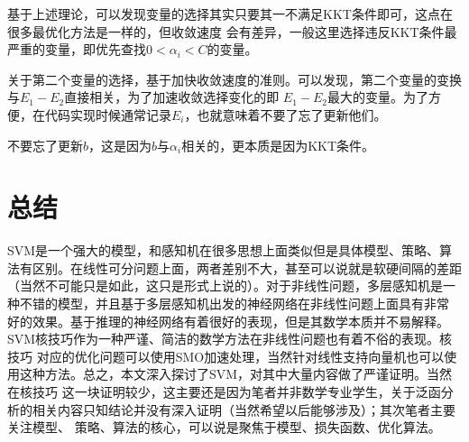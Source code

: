 \documentclass{article}
\begin{document}
        基于上述理论，可以发现变量的选择其实只要其一不满足KKT条件即可，这点在很多最优化方法是一样的，但收敛速度
        会有差异，一般这里选择违反KKT条件最严重的变量，即优先查找$0<\alpha_i<C$的变量。

        关于第二个变量的选择，基于加快收敛速度的准则。可以发现，第二个变量的变换与$E_1-E_2$直接相关，为了加速收敛选择变化的即
        $E_1-E_2$最大的变量。为了方便，在代码实现时候通常记录$E_i$，也就意味着不要了忘了更新他们。

        不要忘了更新$b$，这是因为$b$与$\alpha_i$相关的，更本质是因为KKT条件。

\part{总结}
    SVM是一个强大的模型，和感知机在很多思想上面类似但是具体模型、策略、算法有区别。在线性可分问题上面，两者差别不大，甚至可以说就是软硬间隔的差距
    （当然不可能只是如此，这只是形式上说的）。对于非线性问题，多层感知机是一种不错的模型，并且基于多层感知机出发的神经网络在非线性问题上面具有非常
    好的效果。基于推理的神经网络有着很好的表现，但是其数学本质并不易解释。SVM核技巧作为一种严谨、简洁的数学方法在非线性问题也有着不俗的表现。核技巧
    对应的优化问题可以使用SMO加速处理，当然针对线性支持向量机也可以使用这种方法。总之，本文深入探讨了SVM，对其中大量内容做了严谨证明。当然在核技巧
    这一块证明较少，这主要还是因为笔者并非数学专业学生，关于泛函分析的相关内容只知结论并没有深入证明（当然希望以后能够涉及）；其次笔者主要关注模型、
    策略、算法的核心，可以说是聚焦于模型、损失函数、优化算法。
\end{document}
